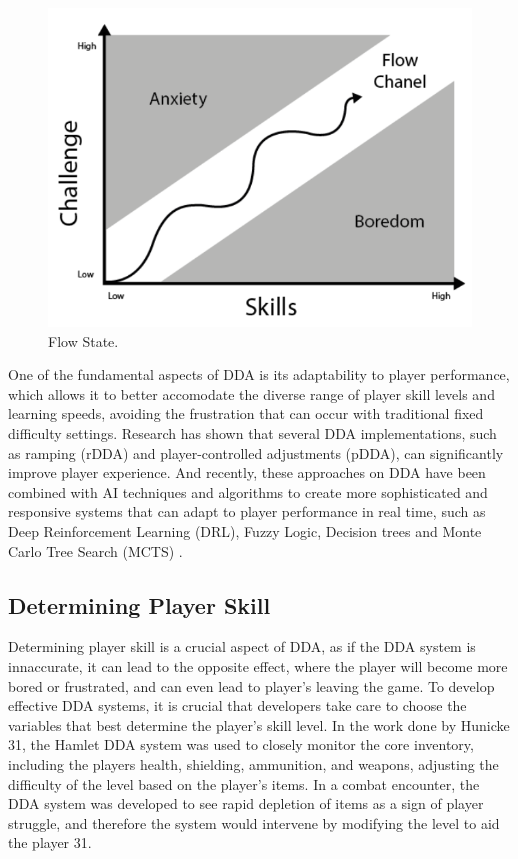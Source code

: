 \begin{spacing}{2.0}
	\begin{figure}[ht]
		\centering
		\includegraphics[width=5in, fbox]{Figures/Flow_State.png}
		\caption{Flow State. \cite{sepulveda_exploring_2019}}
		\label{fig:flowstate}
	\end{figure}

	One of the fundamental aspects of DDA is its adaptability to player performance, which allows it to better accomodate the diverse range of player skill levels and learning speeds, avoiding the frustration that
	can occur with traditional fixed difficulty settings. Research has shown that several DDA implementations, such as ramping (rDDA) and player-controlled adjustments (pDDA), can significantly improve player experience.
	And recently, these approaches on DDA have been combined with AI techniques and algorithms to create more sophisticated and responsive systems that can adapt to player performance in real time, such as
	Deep Reinforcement Learning (DRL), Fuzzy Logic, Decision trees and Monte Carlo Tree Search (MCTS) \cite{attard_analysing_2021} \cite{chrysafiadi_fuzzy_based_2023}.

	\subsection{Determining Player Skill}

	Determining player skill is a crucial aspect of DDA, as if the DDA system is innaccurate, it can lead to the opposite effect, where the player will become more bored or frustrated, and can even lead to player's
	leaving the game. To develop effective DDA systems, it is crucial that developers take care to choose the variables that best determine the player's skill level. In the work done by Hunicke {31}, the Hamlet DDA system was used to
	closely monitor the core inventory, including the players health, shielding, ammunition, and weapons, adjusting the difficulty of the level based on the player's items. In a combat encounter, the DDA system was
	developed to see rapid depletion of items as a sign of player struggle, and therefore the system would intervene by modifying the level to aid the player {31}.


\end{spacing}
